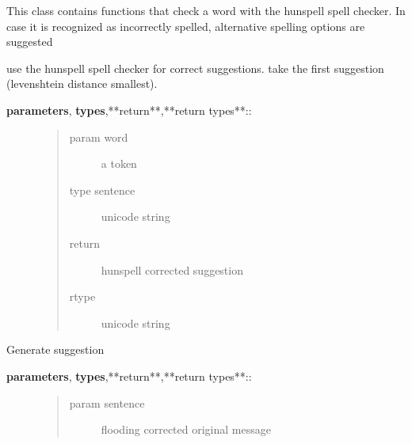 \documentclass[letterpaper,10pt,english]{sphinxmanual}
\begin{document}
\begin{fulllineitems}
\label{API:norm.modules.spellcheck.Hunspell}
This class contains functions that check a word with the hunspell spell checker.
In case it is recognized as incorrectly spelled, alternative spelling options are suggested

\begin{fulllineitems}
\label{API:norm.modules.spellcheck.Hunspell.find_suggestions}
use the hunspell spell checker for correct suggestions. take the first suggestion (levenshtein distance smallest).
\begin{description}
\item[{\textbf{parameters}, \textbf{types},**return**,**return types**::}] \leavevmode\begin{quote}\begin{description}
\item[{param word}] \leavevmode
a token

\item[{type sentence}] \leavevmode
unicode string

\item[{return}] \leavevmode
hunspell corrected suggestion

\item[{rtype}] \leavevmode
unicode string

\end{description}\end{quote}

\end{description}

\end{fulllineitems}


\begin{fulllineitems}
\label{API:norm.modules.spellcheck.Hunspell.generate_alternatives}
Generate suggestion
\begin{description}
\item[{\textbf{parameters}, \textbf{types},**return**,**return types**::}] \leavevmode\begin{quote}\begin{description}
\item[{param sentence}] \leavevmode
flooding corrected original message


\end{description}
\end{quote}
\end{description}
\end{fulllineitems}
\end{fulllineitems}
\end{document}
